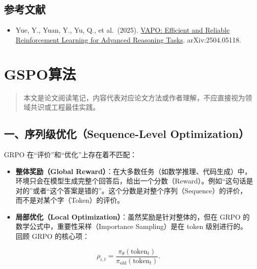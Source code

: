 \hypertarget{ux53c2ux8003ux6587ux732e-110}{%
\subsection{参考文献}\label{ux53c2ux8003ux6587ux732e-110}}

\vspace{0.25em}
\begin{itemize}
\tightlist
\item
  Yue, Y., Yuan, Y., Yu, Q., et al.~(2025). \href{https://arxiv.org/abs/2504.05118}{VAPO: Efficient and Reliable Reinforcement Learning for Advanced Reasoning Tasks}. arXiv:2504.05118.
\end{itemize}

\clearpage

\hypertarget{gspoux7b97ux6cd5}{%
\section{GSPO算法}\label{gspoux7b97ux6cd5}}

\begin{quote}
本文是论文阅读笔记，内容代表对应论文方法或作者理解，不应直接视为领域共识或工程最佳实践。
\end{quote}

\hypertarget{ux4e00ux5e8fux5217ux7ea7ux4f18ux5316sequence-level-optimization}{%
\subsection{一、序列级优化（Sequence-Level Optimization）}\label{ux4e00ux5e8fux5217ux7ea7ux4f18ux5316sequence-level-optimization}}

GRPO 在``评价''和``优化''上存在着不匹配：

\begin{itemize}
\tightlist
\item
  \textbf{整体奖励（Global Reward）}：在大多数任务（如数学推理、代码生成）中，环境只会在模型生成完整个回答后，给出一个分数（Reward）。例如``这句话是对的''或者``这个答案是错的''。这个分数是对整个序列（Sequence）的评价，而不是对某个字（Token）的评价。
\item
  \textbf{局部优化（Local Optimization）}：虽然奖励是针对整体的，但在 GRPO 的数学公式中，重要性采样（Importance Sampling）是在 token 级别进行的。回顾 GRPO 的核心项：
\end{itemize}

\[
\rho_{i,t}
=
\frac{\pi_\theta(\mathrm{token}_t)}
{\pi_{\mathrm{old}}(\mathrm{token}_t)}.
\]

